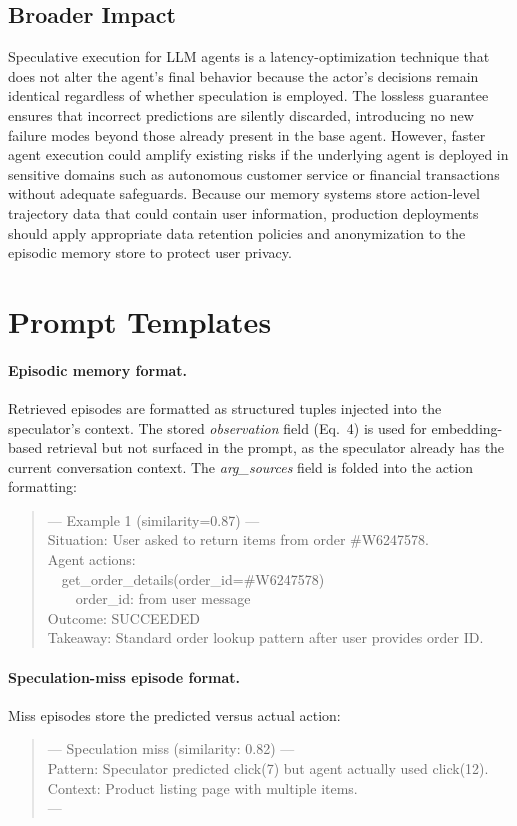 \documentclass{article}
\begin{document}
\subsection{Broader Impact}
\label{app:impact}
Speculative execution for LLM agents is a latency-optimization technique that does not alter the agent's final behavior because the actor's decisions remain identical regardless of whether speculation is employed. The lossless guarantee ensures that incorrect predictions are silently discarded, introducing no new failure modes beyond those already present in the base agent. However, faster agent execution could amplify existing risks if the underlying agent is deployed in sensitive domains such as autonomous customer service or financial transactions without adequate safeguards. Because our memory systems store action-level trajectory data that could contain user information, production deployments should apply appropriate data retention policies and anonymization to the episodic memory store to protect user privacy.

\section{Prompt Templates}
\label{app:prompts}

\paragraph{Episodic memory format.}
Retrieved episodes are formatted as structured tuples injected into the
speculator's context.  The stored \emph{observation} field (Eq.~4) is used
for embedding-based retrieval but not surfaced in the prompt, as the
speculator already has the current conversation context.  The
\emph{arg\_sources} field is folded into the action formatting:
\begin{quote}
\small\ttfamily
--- Example 1 (similarity=0.87) ---\\
Situation: User asked to return items from order \#W6247578.\\
Agent actions:\\
~~get\_order\_details(order\_id=\#W6247578)\\
~~~~order\_id: from user message\\
Outcome: SUCCEEDED\\
Takeaway: Standard order lookup pattern after user provides order ID.
\end{quote}

\paragraph{Speculation-miss episode format.}
Miss episodes store the predicted versus actual action:
\begin{quote}
\small\ttfamily
--- Speculation miss (similarity: 0.82) ---\\
Pattern: Speculator predicted click(7) but agent actually used click(12).\\
Context: Product listing page with multiple items.\\
---
\end{quote}
\end{document}
